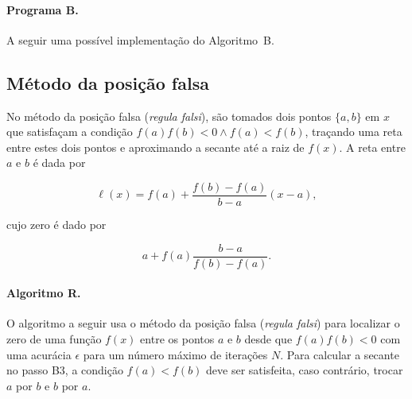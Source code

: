 \paragraph{Programa B.} A seguir uma possível implementação 
do Algoritmo~B.



\pagebreak
\subsection*{Método da posição falsa}

No método da posição falsa ({\it regula falsi\/}), 
são tomados dois pontos $\{a,b\}$ em $x$ que satisfaçam 
a condição $f(a)f(b)<0 \land f(a)<f(b)$, traçando 
uma reta entre estes dois pontos e aproximando a 
secante até a raiz de $f(x)$. A reta entre $a$ 
e $b$ é dada por

\begin{equation}
	\ell(x) = f(a) + \frac{f(b)-f(a)}{b-a}(x-a),
\end{equation}

\noindent cujo zero é dado por

\begin{equation}
	a + f(a)\frac{b-a}{f(b)-f(a)}.
\end{equation}
 
\paragraph{Algoritmo R.}
O algoritmo a seguir usa o método da posição falsa 
({\it regula falsi\/}) para 
localizar o zero de uma função $f(x)$ 
entre os pontos $a$ e $b$ desde que $f(a)f(b)<0$ 
 com uma acurácia $\epsilon$ para um número máximo 
de iterações $N$. Para calcular a secante no passo
B3, a condição $f(a)<f(b)$ deve ser satisfeita, caso
contrário, trocar $a$ por $b$ e $b$ por $a$.
 
